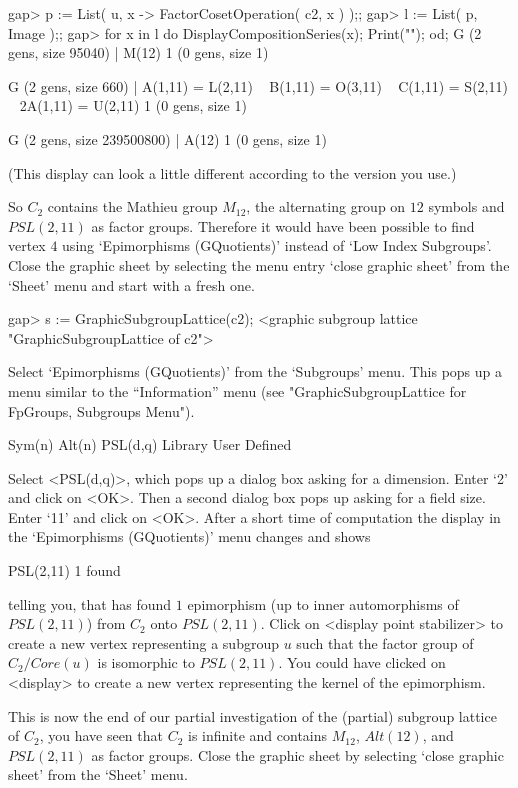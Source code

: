 \begintt
gap> p := List( u, x -> FactorCosetOperation( c2, x ) );;
gap> l := List( p, Image );;
gap> for x  in l  do DisplayCompositionSeries(x);  Print("\n");  od;
G (2 gens, size 95040)
 | M(12)
1 (0 gens, size 1)

G (2 gens, size 660)
 | A(1,11) = L(2,11) ~ B(1,11) = O(3,11) ~ C(1,11) = S(2,11) ~ 2A(1,11) = U(2,11)
1 (0 gens, size 1)

G (2 gens, size 239500800)
 | A(12)
1 (0 gens, size 1)
\endtt

(This display can look a little different according to  the {\GAP} version you
use.)

So $C_2$ contains the Mathieu group $M_{12}$, the alternating group on
$12$  symbols and $PSL(2,11)$   as factor groups.   Therefore it would
have   been   possible  to   find   vertex  $4$   using  
`Epimorphisms (GQuotients)'  instead of  `Low Index Subgroups'.   
Close the graphic
sheet by selecting the menu entry `close graphic sheet' from the `Sheet'
menu and start with a fresh one.

\begintt
gap> s := GraphicSubgroupLattice(c2);
<graphic subgroup lattice "GraphicSubgroupLattice of c2">
\endtt

Select  `Epimorphisms (GQuotients)' from  the  `Subgroups' menu.  This
pops  up   a   menu   similar  to    the  ``Information''   menu    (see
"GraphicSubgroupLattice for FpGroups, Subgroups Menu").

\begintt
Sym(n)
Alt(n)
PSL(d,q)
Library
User Defined 
\endtt

Select <PSL(d,q)>, which pops up a dialog  box asking for a dimension. 
Enter `2' and click on <OK>. Then a second dialog box pops up asking
for a field size.  Enter `11' and click on  <OK>. After a short time
of  computation the display  in  the `Epimorphisms (GQuotients)'  menu
changes and shows

\begintt
PSL(2,11)      1 found
\endtt

telling you, that {\GAP} has found $1$ epimorphism (up to inner
automorphisms of $PSL(2,11)$) from $C_2$ onto $PSL(2,11)$.  Click on
<display point stabilizer> to create a new vertex representing a subgroup
$u$ such that the factor group of $C_2 / Core(u)$ is isomorphic to
$PSL(2,11)$. You could have clicked on <display> to create a new vertex
representing the kernel of the epimorphism.

This is  now the  end of  our  partial investigation of  the (partial)
subgroup lattice of  $C_2$, you have  seen that $C_2$ is infinite  and
contains $M_{12}$, $Alt(12)$, and $PSL(2,11)$ as factor groups.  Close
the  graphic sheet by selecting `close  graphic sheet'  from the `Sheet'
menu.


